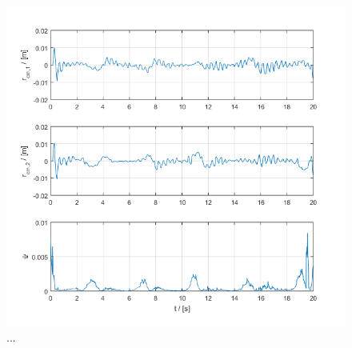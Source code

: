 \begin{figure}[h!]
	\centering
	\includegraphics[width=\columnwidth]{./pictures/mmc_traj_rCm_attErr.png}
	\caption{...}
	\label{fig:rCm_attErr}
\end{figure}
